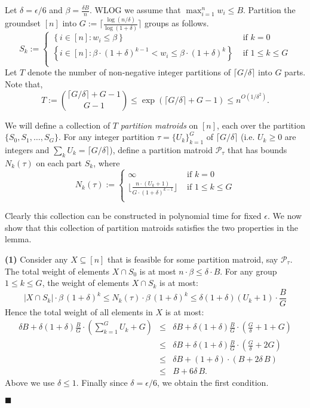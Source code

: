 \documentclass[11pt,letterpaper]{article}
\newenvironment{proof}{

\noindent{\bf Proof:}} {\hfill$\blacksquare$


}
\def\p {\ensuremath{\mathcal{P}}\xspace}
\newcommand{\sse}{\subseteq}
\newcounter{note}[section]
\begin{document}
\begin{proof}
Let $\delta=\epsilon/6$ and $\beta=\frac{\delta B}n$. WLOG we assume that $\max_{i=1}^n w_i\le B$. Partition the
groundset $[n]$ into $G:=\lceil \frac{\log (n/\delta)}{\log (1+\delta)}\rceil$ groups as follows.
$$
S_k := \left\{
\begin{array}{ll}
\left\{i\in[n] : w_i\le \beta \right\} & \mbox{ if }k=0\\
\left\{i\in[n] : \beta\cdot (1+\delta)^{k-1}<w_i\le \beta \cdot (1+\delta)^{k} \right\} & \mbox{ if } 1\le k\le G\\
\end{array}
\right.
$$
Let $T$ denote the number of non-negative integer partitions of $\lceil G/\delta\rceil$ into $G$ parts. Note that,
$$T:={\lceil G/\delta\rceil+G-1 \choose G-1}\le \exp(\lceil G/\delta\rceil+G-1) \le n^{O(1/\delta^2)}.$$

We will define a collection of $T$ {\em partition matroids} on $[n]$, each over the partition $\{S_0,S_1,\ldots,
S_G\}$. For any integer partition $\tau=\{U_k\}_{k=1}^G$ of $\lceil G/\delta\rceil$ (i.e. $U_k\ge 0$ are integers and
$\sum_k U_k= \lceil G/\delta\rceil$), define a partition matroid $\p_\tau$ that has bounds $N_k(\tau)$ on each part
$S_k$, where
$$
N_k(\tau) := \left\{
\begin{array}{ll}
\infty & \mbox{ if }k=0\\
\lfloor \frac{n\cdot (U_k+1)}{G\cdot (1+\delta)^{k-1}} \rfloor& \mbox{ if } 1\le k\le G\\
\end{array}
\right.
$$

Clearly this collection can be constructed in polynomial time for fixed $\epsilon$. We now show that this collection of
partition matroids satisfies the two properties in the lemma.

{\bf (1)} Consider any $X\sse[n]$ that is feasible for some partition matroid, say $\p_\tau$. The total weight of
elements $X\cap S_0$ is at most $n\cdot \beta\le \delta\cdot B$. For any group $1\le k\le G$, the weight of elements
$X\cap S_k$ is at most:
$$ |X\cap S_k|\cdot  \beta \, (1+\delta)^{k} \le N_k(\tau)\cdot \beta \, (1+\delta)^{k}\le \delta(1+\delta)(U_k+1)\cdot
\frac{B}G$$ Hence the total weight of all elements in $X$ is at most:
\begin{eqnarray*}
\delta B + \delta(1+\delta)\frac{B}G \cdot\left( \sum_{k=1}^G U_k+G\right) & \le & \delta B + \delta(1+\delta)\frac{B}G \cdot\left( \frac{G}\delta +1+G\right) \\
&\le &\delta B + \delta(1+\delta)\frac{B}G \cdot\left( \frac{G}\delta + 2G\right) \\
&\le & \delta B + (1+\delta)\cdot\left( B + 2\delta \,B\right) \\
&\le & B+6\delta\, B.
\end{eqnarray*}
Above we use $\delta\le 1$. Finally since $\delta=\epsilon/6$, we obtain the first condition.


\end{proof}
\end{document}
